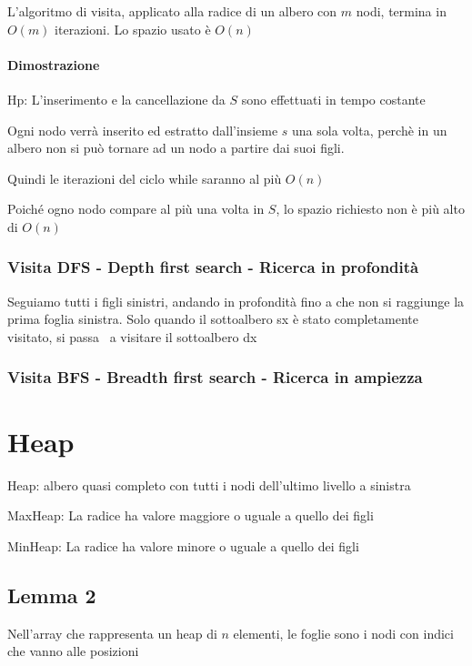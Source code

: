 \documentclass[11pt,a4paper,twoside,openright]{book}
\let\oldparagraph\paragraph
\renewcommand{\paragraph}[1]{\oldparagraph{#1}\mbox{}}
\begin{document}
{{{{L'algoritmo di visita, applicato alla radice di un albero con $m$ nodi, termina in $O(m)$ iterazioni. Lo spazio usato è $O(n)$}

\paragraph{Dimostrazione}

{Hp: L'inserimento e la cancellazione da $S$ sono effettuati in tempo costante}

{Ogni nodo verrà inserito ed estratto dall'insieme $s$ una sola volta, perchè in un albero non si può tornare ad un nodo a partire dai suoi figli.}

{Quindi le iterazioni del ciclo while saranno al più $O(n)$}

{Poiché ogno nodo compare al più una volta in $S$, lo spazio richiesto non è più alto di $O(n)$}

\subsubsection{Visita DFS - Depth first search - Ricerca in profondità}

{Seguiamo tutti i figli sinistri, andando in profondità fino a che non si raggiunge la prima foglia sinistra. Solo quando il sottoalbero sx è stato completamente visitato, si passa ~a visitare il sottoalbero dx}



\subsubsection{Visita BFS - Breadth first search - Ricerca in ampiezza}

\section{Heap}

{Heap: albero quasi completo con tutti i nodi dell'ultimo livello a sinistra}

{MaxHeap: La radice ha valore maggiore o uguale a quello dei figli}

{MinHeap: La radice ha valore minore o uguale a quello dei figli}

\subsection{Lemma 2}

{Nell'array che rappresenta un heap di $n$ elementi, le foglie sono i nodi con indici che vanno alle posizioni}

}}}
\end{document}
